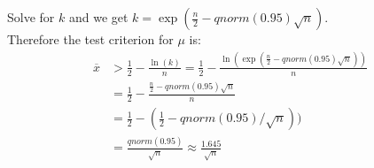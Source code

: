 \documentclass[10pt, letterpaper, titlepage]{article}
\newcommand{\mx}{\overline{x}}
\begin{document}
        Solve for $k$ and we get $k = \exp(\frac{n}{2} - qnorm(0.95)\sqrt{n})$.\\
        Therefore the test criterion for $\mu$ is:
        \begin{align*}
            \mx &> \frac{1}{2} - \frac{\ln(k)}{n}
            = \frac{1}{2} - \frac{\ln(\exp(\frac{n}{2} - qnorm(0.95)\sqrt{n}))}{n}\\
            &= \frac{1}{2} - \frac{\frac{n}{2} - qnorm(0.95)\sqrt{n}}{n}\\
            &= \frac{1}{2} -( \frac{1}{2} - qnorm(0.95)/\sqrt{n}))\\
            &= \frac{qnorm(0.95)}{\sqrt{n}} \approx \frac{1.645}{\sqrt{n}}
        \end{align*}
\end{document}
